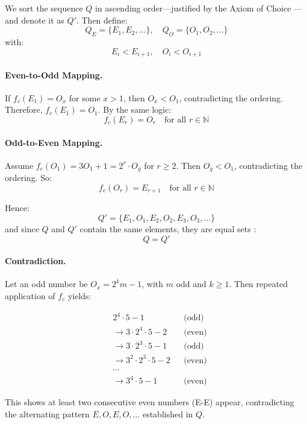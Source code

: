 \documentclass{zc-ust-hw}
\begin{document}
We sort the sequence \( Q \) in ascending order—justified by the Axiom of Choice \cite{ref1}—and denote it as \( Q' \). Then define:
\[
  Q_E = \{E_1, E_2, \dots\}, \quad Q_O = \{O_1, O_2, \dots\}
\]
with:
\[
  E_i < E_{i+1}, \quad O_i < O_{i+1}
\]

\paragraph{Even-to-Odd Mapping.} If \( f_c(E_1) = O_x \) for some \( x > 1 \), then \( O_x < O_1 \), contradicting the ordering. Therefore, \( f_c(E_1) = O_1 \). By the same logic:
\[
  f_c(E_r) = O_r \quad \text{for all } r \in \mathbb{N}
\]

\paragraph{Odd-to-Even Mapping.} Assume \( f_c(O_1) = 3O_1 + 1 = 2^r \cdot O_y \) for \( r \geq 2 \). Then \( O_y < O_1 \), contradicting the ordering. So:
\[
  f_c(O_r) = E_{r+1} \quad \text{for all } r \in \mathbb{N}
\]

Hence:
\[
  Q' = \{E_1, O_1, E_2, O_2, E_3, O_3, \dots\}
\]
and since \( Q \) and \( Q' \) contain the same elements, they are equal sets \cite{ref1}:
\[
  Q = Q'
\]

\paragraph{Contradiction.} Let an odd number be \( O_x = 2^k m - 1 \), with \( m \) odd and \( k \geq 1 \). Then repeated application of \( f_c \) yields:

\begin{align*}
   & 2^4 \cdot 5 - 1                       &  & \text{(odd)}  \\
   & \rightarrow 3 \cdot 2^4 \cdot 5 - 2   &  & \text{(even)} \\
   & \rightarrow 3 \cdot 2^3 \cdot 5 - 1   &  & \text{(odd)}  \\
   & \rightarrow 3^2 \cdot 2^3 \cdot 5 - 2 &  & \text{(even)} \\
   & \cdots                                                   \\
   & \rightarrow 3^4 \cdot 5 - 1           &  & \text{(even)}
\end{align*}

This shows at least two consecutive even numbers (E-E) appear, contradicting the alternating pattern \( E, O, E, O, \dots \) established in \( Q \).
\end{document}

